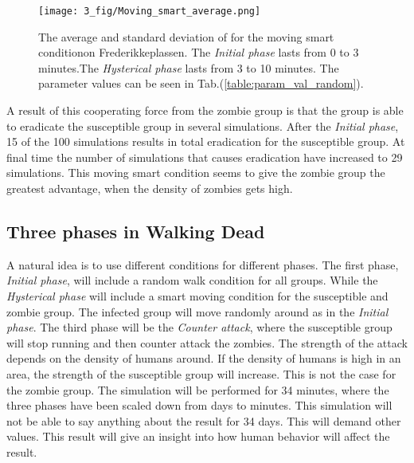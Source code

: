 \documentclass[%
twoside,                 %
final,                   %
chapterprefix=true,      %
open=right               %
10pt]{book}
\begin{document}
\vspace{3mm}




\vspace{3mm}




\begin{figure}[ht]
  \centerline{\texttt{[image: 3\_fig/Moving\_smart\_average.png]}}
  \caption{
  \label{fig:average_moving_smart} The average and standard deviation of for the moving smart conditionon Frederikkeplassen. The \emph{Initial phase} lasts from 0 to 3 minutes.The \emph{Hysterical phase} lasts from 3 to 10 minutes. The parameter values can be seen in Tab.(\ref{table:param_val_random}).
  }
\end{figure}


A result of this cooperating force from the zombie group is that the group is able to eradicate the susceptible group in several simulations. After the \emph{Initial phase}, 15 of the 100 simulations results in total eradication for the susceptible group. At final time the number of simulations that causes eradication have increased to 29 simulations. This moving smart condition seems to give the zombie group the greatest advantage, when the density of zombies gets high.

\subsection{Three phases in Walking Dead}
A natural idea is to use different conditions for different phases. The first phase, \emph{Initial phase}, will include a random walk condition for all groups. While the \emph{Hysterical phase} will include a smart moving condition for the susceptible and zombie group. The infected group will move randomly around as in the \emph{Initial phase}. The third phase will be the \emph{Counter attack}, where the susceptible group will stop running and then counter attack the zombies. The strength of the attack depends on the density of humans around. If the density of humans is high in an area, the strength of the susceptible group will increase. This is not the case for the zombie group. The simulation will be performed for 34 minutes, where the three phases have been scaled down from days to minutes. This simulation will not be able to say anything about the result for 34 days. This will demand other values. This result will give an insight into how human behavior will affect the result.  
\end{document}
